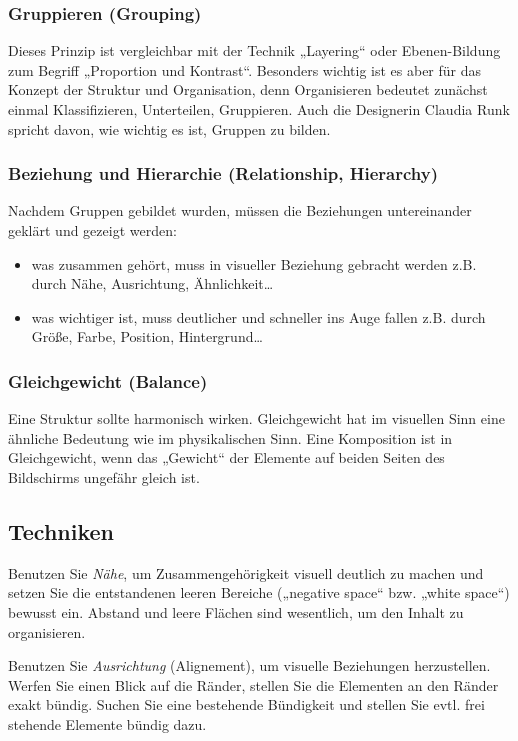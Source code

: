 \subsubsection*{Gruppieren (Grouping)}
Dieses Prinzip ist vergleichbar mit der Technik  „Layering“ oder Ebenen-Bildung zum Begriff „Proportion und Kontrast“. Besonders wichtig ist es aber für das Konzept der Struktur und Organisation, denn Organisieren bedeutet zunächst einmal Klassifizieren, Unterteilen, Gruppieren. Auch die Designerin Claudia Runk spricht davon, wie wichtig es ist, Gruppen zu bilden.

\subsubsection*{Beziehung und Hierarchie (Relationship, Hierarchy)}
Nachdem Gruppen gebildet wurden, müssen die Beziehungen untereinander geklärt und gezeigt werden:
\begin{itemize}
\item was zusammen gehört, muss in visueller Beziehung gebracht werden z.B. durch Nähe, Ausrichtung, Ähnlichkeit…
\item was wichtiger ist, muss deutlicher und schneller ins Auge fallen z.B. durch Größe, Farbe, Position, Hintergrund…

\end{itemize}
 
\subsubsection*{Gleichgewicht (Balance)}
Eine Struktur sollte harmonisch wirken. Gleichgewicht hat im visuellen Sinn eine ähnliche Bedeutung wie im physikalischen Sinn. Eine Komposition ist in Gleichgewicht, wenn das „Gewicht“ der Elemente auf beiden Seiten des Bildschirms ungefähr gleich ist.


\subsection{Techniken}
Benutzen Sie \emph{Nähe}, um Zusammengehörigkeit visuell deutlich zu machen und setzen Sie die entstandenen leeren Bereiche („negative space“ bzw. „white space“) bewusst ein. Abstand und leere Flächen sind wesentlich, um den Inhalt zu organisieren.\bigskip  
 
Benutzen Sie \emph{Ausrichtung} (Alignement), um visuelle Beziehungen herzustellen. Werfen Sie einen Blick auf die Ränder, stellen Sie die Elementen an den Ränder exakt bündig. Suchen Sie eine bestehende Bündigkeit und stellen Sie evtl. frei stehende Elemente bündig dazu.\bigskip

